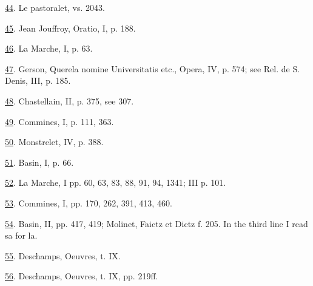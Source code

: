 \protect\hypertarget{23_NOTES.xhtmlux5cux23id_546}{\protect\hyperlink{18_Chapter_Eleven__THE_FORMS_OF_THO.xhtmlux5cux23id_545}{44}}.
Le pastoralet, vs. 2043.

\protect\hypertarget{23_NOTES.xhtmlux5cux23id_544}{\protect\hyperlink{18_Chapter_Eleven__THE_FORMS_OF_THO.xhtmlux5cux23id_543}{45}}.
Jean Jouffroy, Oratio, I, p. 188.

\protect\hypertarget{23_NOTES.xhtmlux5cux23id_542}{\protect\hyperlink{18_Chapter_Eleven__THE_FORMS_OF_THO.xhtmlux5cux23id_541}{46}}.
La Marche, I, p. 63.

\protect\hypertarget{23_NOTES.xhtmlux5cux23id_540}{\protect\hyperlink{18_Chapter_Eleven__THE_FORMS_OF_THO.xhtmlux5cux23id_539}{47}}.
Gerson, Querela nomine Universitatis etc., Opera, IV, p. 574; see Rel.
de S. Denis, III, p. 185.

\protect\hypertarget{23_NOTES.xhtmlux5cux23id_538}{\protect\hyperlink{18_Chapter_Eleven__THE_FORMS_OF_THO.xhtmlux5cux23id_537}{48}}.
Chastellain, II, p. 375, see 307.

\protect\hypertarget{23_NOTES.xhtmlux5cux23id_536}{\protect\hyperlink{18_Chapter_Eleven__THE_FORMS_OF_THO.xhtmlux5cux23id_535}{49}}.
Commines, I, p. 111, 363.

\protect\hypertarget{23_NOTES.xhtmlux5cux23id_534}{\protect\hyperlink{18_Chapter_Eleven__THE_FORMS_OF_THO.xhtmlux5cux23id_533}{50}}.
Monstrelet, IV, p. 388.

\protect\hypertarget{23_NOTES.xhtmlux5cux23id_532}{\protect\hyperlink{18_Chapter_Eleven__THE_FORMS_OF_THO.xhtmlux5cux23id_531}{51}}.
Basin, I, p. 66.

\protect\hypertarget{23_NOTES.xhtmlux5cux23id_530}{\protect\hyperlink{18_Chapter_Eleven__THE_FORMS_OF_THO.xhtmlux5cux23id_529}{52}}.
La Marche, I pp. 60, 63, 83, 88, 91, 94, 1341; III p. 101.

\protect\hypertarget{23_NOTES.xhtmlux5cux23id_528}{\protect\hyperlink{18_Chapter_Eleven__THE_FORMS_OF_THO.xhtmlux5cux23id_527}{53}}.
Commines, I, pp. 170, 262, 391, 413, 460.

\protect\hypertarget{23_NOTES.xhtmlux5cux23id_526}{\protect\hyperlink{18_Chapter_Eleven__THE_FORMS_OF_THO.xhtmlux5cux23id_525}{54}}.
Basin, II, pp. 417, 419; Molinet, Faictz et Dictz f. 205. In the third
line I read sa for la.

\protect\hypertarget{23_NOTES.xhtmlux5cux23id_524}{\protect\hyperlink{18_Chapter_Eleven__THE_FORMS_OF_THO.xhtmlux5cux23id_523}{55}}.
Deschamps, Oeuvres, t. IX.

\protect\hypertarget{23_NOTES.xhtmlux5cux23id_522}{\protect\hyperlink{18_Chapter_Eleven__THE_FORMS_OF_THO.xhtmlux5cux23id_521}{56}}.
Deschamps, Oeuvres, t. IX, pp. 219ff.

